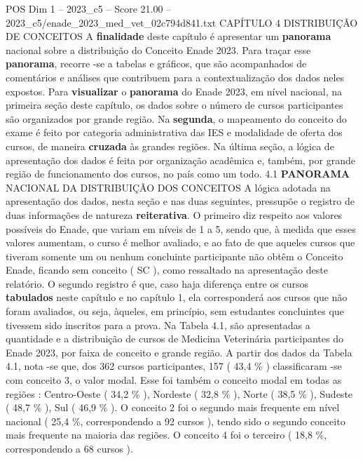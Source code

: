 \begin{textsample}{POS Dim 1 – 2023\_c5 – Score 21.00 – 2023\_c5/enade\_2023\_med\_vet\_02c794d841.txt}  \label{ex:f1_pos_018}
CAPÍTULO 4 DISTRIBUIÇÃO DE CONCEITOS A \textbf{finalidade} deste capítulo é apresentar um \textbf{panorama} nacional sobre a distribuição do Conceito Enade 2023.
Para traçar esse \textbf{panorama}, recorre -se a tabelas e gráficos, que são acompanhados de comentários e análises que contribuem para a contextualização dos dados neles expostos.
Para \textbf{visualizar} o \textbf{panorama} do Enade 2023, em nível nacional, na primeira seção deste capítulo, os dados sobre o número de cursos participantes são organizados por grande região.
Na \textbf{segunda}, o mapeamento do conceito do exame é feito por categoria administrativa das IES e modalidade de oferta dos cursos, de maneira \textbf{cruzada} às grandes regiões.
Na última seção, a lógica de apresentação dos dados é feita por organização acadêmica e, também, por grande região de funcionamento dos cursos, no país como um todo. 4.1 \textbf{PANORAMA} NACIONAL DA DISTRIBUIÇÃO DOS CONCEITOS A lógica adotada na apresentação dos dados, nesta seção e nas duas seguintes, pressupõe o registro de duas informações de natureza \textbf{reiterativa}.
O primeiro diz respeito aos valores possíveis do Enade, que variam em níveis de 1 a 5, sendo que, à medida que esses valores aumentam, o curso é melhor avaliado, e ao fato de que aqueles cursos que tiveram somente um ou nenhum concluinte participante não obtêm o Conceito Enade, ficando sem conceito ( SC ), como ressaltado na apresentação deste relatório.
O segundo registro é que, caso haja diferença entre os cursos \textbf{tabulados} neste capítulo e no capítulo 1, ela corresponderá aos cursos que não foram avaliados, ou seja, àqueles, em princípio, sem estudantes concluintes que tivessem sido inscritos para a prova.
Na Tabela 4.1, são apresentadas a quantidade e a distribuição de cursos de Medicina Veterinária participantes do Enade 2023, por faixa de conceito e grande região.
A partir dos dados da Tabela 4.1, nota -se que, dos 362 cursos participantes, 157 ( 43,4 \% ) classificaram -se com conceito 3, o valor modal.
Esse foi também o conceito modal em todas as regiões : Centro-Oeste ( 34,2 \% ), Nordeste ( 32,8 \% ), Norte ( 38,5 \% ), Sudeste ( 48,7 \% ), Sul ( 46,9 \% ).
O conceito 2 foi o segundo mais frequente em nível nacional ( 25,4 \%, correspondendo a 92 cursos ), tendo sido o segundo conceito mais frequente na maioria das regiões.
O conceito 4 foi o terceiro ( 18,8 \%, correspondendo a 68 cursos ).

\end{textsample}
